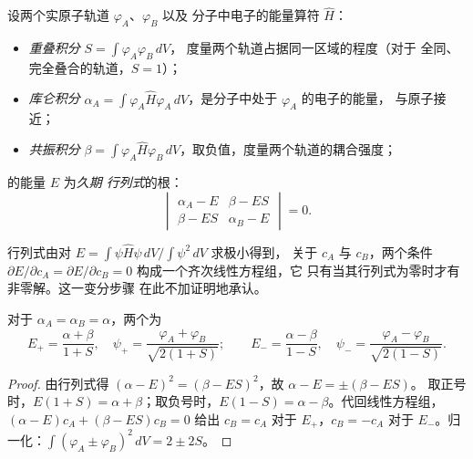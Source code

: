 \begin{definition}\label{def:b2:diatomic-mos:integrals}
设两个实原子轨道 $\varphi_A$、$\varphi_B$ 以及
分子中电子的能量算符 $\hat H$：
\begin{itemize}
  \item \emph{重叠积分} $S = \int\varphi_A\varphi_B\,dV$，
        度量两个轨道占据同一区域的程度（对于
        全同、完全叠合的轨道，$S = 1$）；
  \item \emph{库仑积分} $\alpha_A = \int\varphi_A\hat
        H\varphi_A\,dV$，是分子中处于 $\varphi_A$ 的电子的能量，
        与原子接近；
  \item \emph{共振积分} $\beta = \int\varphi_A\hat
        H\varphi_B\,dV$，取负值，度量两个轨道的耦合强度；
\end{itemize}
的能量 $E$ 为\emph{久期
行列式}的根：
\[
  \begin{vmatrix} \alpha_A - E & \beta - ES \\ \beta - ES & \alpha_B - E \end{vmatrix} = 0 .
\]
\end{definition}

行列式由对 $E = \int\psi\hat H\psi\,dV/\int\psi^2\,dV$ 求极小得到，
关于 $c_A$ 与 $c_B$，两个条件 $\partial E/\partial c_A =
\partial E/\partial c_B = 0$ 构成一个齐次线性方程组，它
只有当其行列式为零时才有非零解。这一变分步骤
在此不加证明地承认。

\begin{theorem}[两个全同轨道]\label{thm:b2:diatomic-mos:homonuclear}
对于 $\alpha_A = \alpha_B = \alpha$，两个为
\[
  E_+ = \frac{\alpha + \beta}{1 + S}, \quad \psi_+ = \frac{\varphi_A + \varphi_B}{\sqrt{2(1 + S)}} ;
  \qquad
  E_- = \frac{\alpha - \beta}{1 - S}, \quad \psi_- = \frac{\varphi_A - \varphi_B}{\sqrt{2(1 - S)}} .
\]
\end{theorem}

\begin{proof}
由行列式得 $(\alpha - E)^2 = (\beta - ES)^2$，故 $\alpha - E = \pm(\beta - ES)$。
取正号时，$E(1 + S) = \alpha + \beta$；取负号时，$E(1 - S) = \alpha
- \beta$。代回线性方程组，$(\alpha - E)c_A + (\beta - ES)c_B = 0$ 给出 $c_B
= c_A$ 对于 $E_+$，$c_B = -c_A$ 对于 $E_-$。归一化：$\int(\varphi_A \pm
\varphi_B)^2\,dV = 2 \pm 2S$。
\end{proof}

